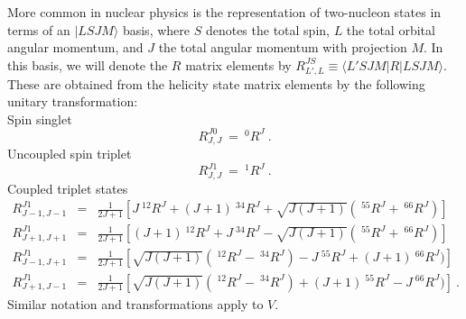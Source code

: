 More common in nuclear physics is the representation of 
two-nucleon states
in terms of an 
$|LSJM\rangle$ basis, 
where $S$ denotes the total spin, $L$ the total orbital 
angular momentum, and $J$ the total angular momentum with 
projection $M$. 
In this basis, we will denote the ${R}$ matrix elements by
${R}^{JS}_{L',L}\equiv \langle L'SJM|{R}|LSJM\rangle$.
  These are obtained from the helicity state matrix 
elements by the following unitary transformation:\\
{ Spin singlet}
\begin{equation}
{R}^{J0}_{J,J}\: =\: ^0{R}^J
\: .
\label{22.10}
\end{equation}
{ Uncoupled spin triplet} 
\begin{equation}
{R}^{J1}_{J,J}\: =\: ^1{R}^J
\: .
\label{22.11}
\end{equation}
{ Coupled triplet states}
\begin{eqnarray}
{R}^{J1}_{J-1,J-1} & = & \frac{1}{2J+1} \left[J\: ^{12}{R}^J 
+ (J+1)\: ^{34}{R}^J
+ \sqrt{J(J+1)}(\: ^{55}{R}^J+\: ^{66}{R}^J)\right]
\nonumber \\
{R}^{J1}_{J+1,J+1} & = & \frac{1}{2J+1} \left[(J+1)\: ^{12}{R}^J 
+ J\: ^{34}{R}^J
- \sqrt{J(J+1)}(\: ^{55}{R}^J+\: ^{66}{R}^J)\right]
\nonumber \\
{R}^{J1}_{J-1,J+1} & = & \frac{1}{2J+1} \left[\sqrt{J(J+1)}
(\: ^{12}{R}^J -\: ^{34}{R}^J)
- J\: ^{55}{R}^J + (J+1)\: ^{66}{R}^J)\right]
\nonumber  \\
{R}^{J1}_{J+1,J-1} & = & \frac{1}{2J+1} \left[\sqrt{J(J+1)}
(\: ^{12}{R}^J -\: ^{34}{R}^J)
+ (J+1)\: ^{55}{R}^J - J\: ^{66}{R}^J)\right]
\: .
\label{22.12} 
\end{eqnarray}
Similar notation and transformations apply to ${V}$.

